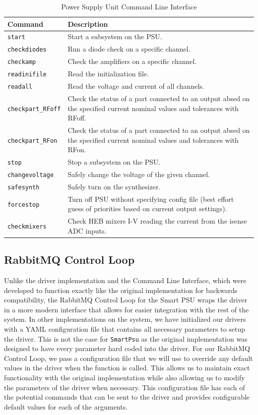 \begin{table}
    \centering
    \begin{tabularx}{\textwidth}{l|X}
        \textbf{Command} & \textbf{Description} \\
        \hline
        \texttt{start} & Start a subsystem on the PSU. \\
        \texttt{checkdiodes} & Run a diode check on a specific channel. \\
        \texttt{checkamp} & Check the amplifiers on a specific channel. \\
        \texttt{readinifile} & Read the initialization file. \\
        \texttt{readall} & Read the voltage and current of all channels. \\
        \texttt{checkpart\_RFoff} & Check the status of a part connected to an output absed on the specified current nominal values and tolerances with RFoff. \\
        \texttt{checkpart\_RFon} & Check the status of a part connected to an output absed on the specified current nominal values and tolerances with RFon. \\
        \texttt{stop} & Stop a subsystem on the PSU. \\
        \texttt{changevoltage} & Safely change the voltage of the given channel. \\
        \texttt{safesynth} & Safely turn on the synthesizer. \\
        \texttt{forcestop} & Turn off PSU without specifying config file (best effort guess of priorities based on current output settings). \\
        \texttt{checkmixers} & Check HEB mixers I-V reading the current from the isense ADC inputs.
    \end{tabularx}
    \label{readout/table:psu_cli}
    \caption{Power Supply Unit Command Line Interface}
\end{table}

\subsection{RabbitMQ Control Loop}
Unlike the driver implementation and the Command Line Interface, which were developed to function exactly like the original implementation for backwards compatibility, the RabbitMQ Control Loop for the Smart PSU wraps the driver in a more modern interface that allows for easier integration with the rest of the system.
In other implementations on the system, we have initialized our drivers with a YAML configuration file that contains all necessary parameters to setup the driver. 
This is not the case for \texttt{SmartPsu} as the original implementation was designed to have every parameter hard coded into the driver.
For our RabbitMQ Control Loop, we pass a configuration file that we will use to override any default values in the driver when the function is called. 
This allows us to maintain exact functionality with the original implementation while also allowing us to modify the parameters of the driver when necessary.
This configuration file has each of the potential commands that can be sent to the driver and provides configurable default values for each of the arguments.

